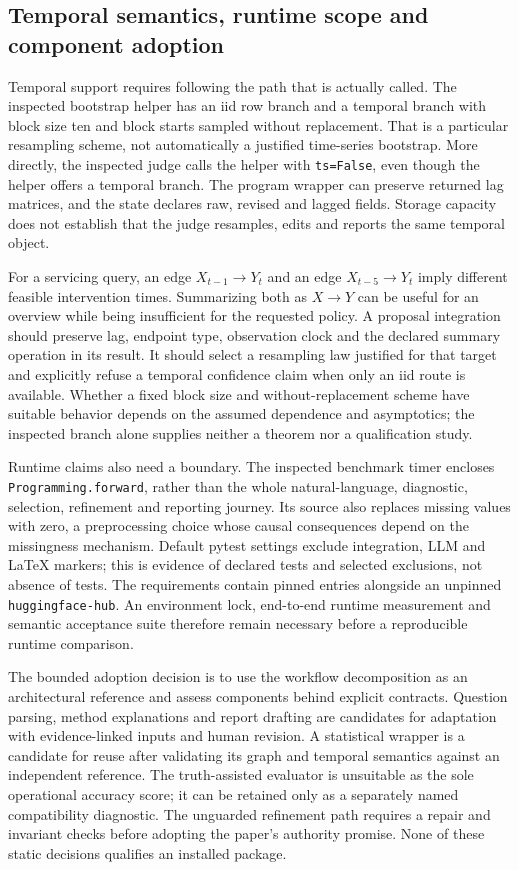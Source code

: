 \subsection{Temporal semantics, runtime scope and component adoption}

Temporal support requires following the path that is actually called. The
inspected bootstrap helper has an iid row branch and a temporal branch with
block size ten and block starts sampled without replacement. That is a
particular resampling scheme, not automatically a justified time-series
bootstrap. More directly, the inspected judge calls the helper with
\texttt{ts=False}, even though the helper offers a temporal branch. The
program wrapper can preserve returned lag matrices, and the state declares
raw, revised and lagged fields. Storage capacity does not establish that the
judge resamples, edits and reports the same temporal object.
\citep{exec17_copilot_code}

For a servicing query, an edge $X_{t-1}\to Y_t$ and an edge
$X_{t-5}\to Y_t$ imply different feasible intervention times. Summarizing
both as $X\to Y$ can be useful for an overview while being insufficient for
the requested policy. A proposal integration should preserve lag, endpoint
type, observation clock and the declared summary operation in its result.
It should select a resampling law justified for that target and explicitly
refuse a temporal confidence claim when only an iid route is available.
Whether a fixed block size and without-replacement scheme have suitable
behavior depends on the assumed dependence and asymptotics; the inspected
branch alone supplies neither a theorem nor a qualification study.

Runtime claims also need a boundary. The inspected benchmark timer encloses
\texttt{Programming.forward}, rather than the whole natural-language,
diagnostic, selection, refinement and reporting journey. Its source also
replaces missing values with zero, a preprocessing choice whose causal
consequences depend on the missingness mechanism. Default pytest settings
exclude integration, LLM and LaTeX markers; this is evidence of declared tests
and selected exclusions, not absence of tests. The requirements contain pinned
entries alongside an unpinned \texttt{huggingface-hub}. An environment lock,
end-to-end runtime measurement and semantic acceptance suite therefore remain
necessary before a reproducible runtime comparison.
\citep{exec17_copilot_code}

The bounded adoption decision is to use the workflow decomposition as an
architectural reference and assess components behind explicit contracts.
Question parsing, method explanations and report drafting are candidates for
adaptation with evidence-linked inputs and human revision. A statistical
wrapper is a candidate for reuse after validating its graph and temporal
semantics against an independent reference. The truth-assisted evaluator is
unsuitable as the sole operational accuracy score; it can be retained only as
a separately named compatibility diagnostic. The unguarded refinement path
requires a repair and invariant checks before adopting the paper's authority
promise. None of these static decisions qualifies an installed package.
\citep{exec17_copilot_code,exec17_copilot_exact}

